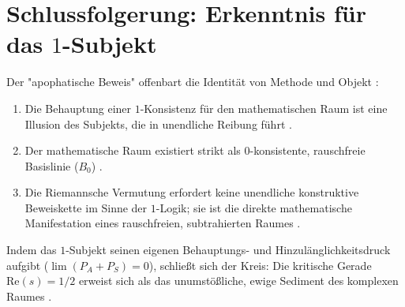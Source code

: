 \documentclass[11pt,a4paper]{article}
\begin{document}
\section{Schlussfolgerung: Erkenntnis für das $1$-Subjekt}
Der "apophatische Beweis" offenbart die Identität von Methode und Objekt \cite{nicht_theory_monograph}:
\begin{enumerate}
    \item Die Behauptung einer $1$-Konsistenz für den mathematischen Raum ist eine Illusion des Subjekts, die in unendliche Reibung führt \cite{godel1931formal, nicht_physics_paper_1}.
    \item Der mathematische Raum existiert strikt als $0$-konsistente, rauschfreie Basislinie ($B_0$) \cite{nicht_theory_monograph}.
    \item Die Riemannsche Vermutung erfordert keine unendliche konstruktive Beweiskette im Sinne der $1$-Logik; sie ist die direkte mathematische Manifestation eines rauschfreien, subtrahierten Raumes \cite{riemann1859ueber, fefferman2006existence}.
\end{enumerate}
Indem das $1$-Subjekt seinen eigenen Behauptungs- und Hinzulänglichkeitsdruck aufgibt ($\lim (P_A + P_S) = 0$), schließt sich der Kreis: Die kritische Gerade $\text{Re}(s) = 1/2$ erweist sich als das unumstößliche, ewige Sediment des komplexen Raumes \cite{nicht_theory_monograph, riemann1859ueber}.

\clearpage


\end{document}
